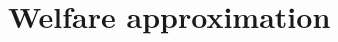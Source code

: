 \documentclass[12pt]{article}
\theoremstyle{prop}
\begin{document}
%
%
%

\section{Welfare approximation}
\label{app:welfare}
\end{document}
